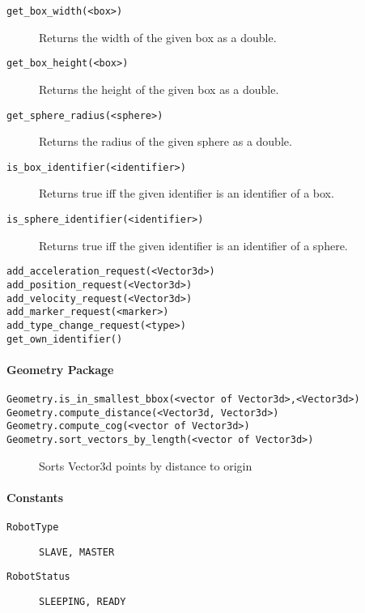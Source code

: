 \begin{description}
	\item [\texttt{get\_box\_width(<box>)}] Returns the width of the given box as a double.
	\item [\texttt{get\_box\_height(<box>)}] Returns the height of the given box as a double.
	\item [\texttt{get\_sphere\_radius(<sphere>)}] Returns the radius of the given sphere as a double.
	\item [\texttt{is\_box\_identifier(<identifier>)}] Returns true iff the given identifier is an identifier of a box.
	\item [\texttt{is\_sphere\_identifier(<identifier>)}] Returns true iff the given identifier is an identifier of a sphere.
	\item [\texttt{add\_acceleration\_request(<Vector3d>)}] 
	\item [\texttt{add\_position\_request(<Vector3d>)}]
	\item [\texttt{add\_velocity\_request(<Vector3d>)}]
	\item [\texttt{add\_marker\_request(<marker>)}]
	\item [\texttt{add\_type\_change\_request(<type>)}]
	\item [\texttt{get\_own\_identifier()}]
\end{description}

\paragraph{Geometry Package}
\begin{description}
	\item [\texttt{Geometry.is\_in\_smallest\_bbox(<vector of Vector3d>,<Vector3d>)}]
	\item [\texttt{Geometry.compute\_distance(<Vector3d, Vector3d>)}]
	\item [\texttt{Geometry.compute\_cog(<vector of Vector3d>)}]
	\item [\texttt{Geometry.sort\_vectors\_by\_length(<vector of Vector3d>)}] Sorts Vector3d points by distance to origin
\end{description}


\paragraph{\Lua Constants}
\begin{description}
	\item [\texttt{RobotType}] \texttt{SLAVE, MASTER}
	\item [\texttt{RobotStatus}] \texttt{SLEEPING, READY}
\end{description}

